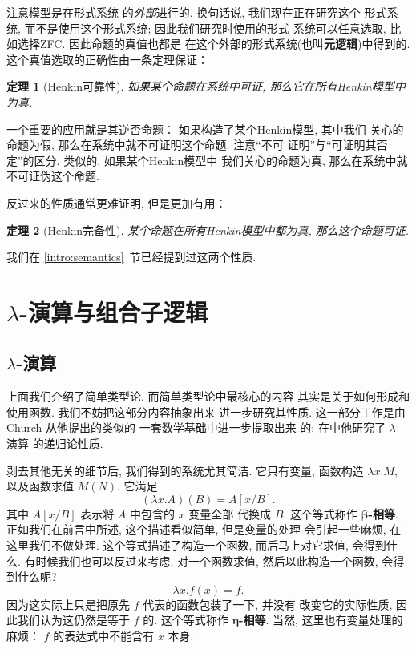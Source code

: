 \documentclass[UTF8]{ctexbook}
\theoremstyle{plain}
\newtheorem{theorem}{定理}[chapter]
\theoremstyle{definition}
\theoremstyle{remark}
\begin{document}
注意模型是在形式系统
的\emph{外部}进行的. 换句话说, 我们现在正在研究这个
形式系统, 而不是使用这个形式系统; 因此我们研究时使用的形式
系统可以任意选取, 比如选择ZFC. 因此命题的真值也都是
在这个外部的形式系统(也叫\textbf{元逻辑})中得到的.
这个真值选取的正确性由一条定理保证：
\begin{theorem}[Henkin可靠性]
如果某个命题在系统中可证, 那么它在所有Henkin模型中为真.
\end{theorem}
一个重要的应用就是其逆否命题：
如果构造了某个Henkin模型, 其中我们
关心的命题为假, 那么在系统中就不可证明这个命题. 注意“不可
证明”与“可证明其否定”的区分. 类似的, 如果某个Henkin模型中
我们关心的命题为真, 那么在系统中就不可证伪这个命题.

反过来的性质通常更难证明, 但是更加有用：
\begin{theorem}[Henkin完备性]
某个命题在所有Henkin模型中都为真, 那么这个命题可证.
\end{theorem}
我们在 \ref{intro:semantics}~节已经提到过这两个性质.

\section{\texorpdfstring{\(\lambda\)}{Lambda}-演算与组合子逻辑}
\subsection{\texorpdfstring{\(\lambda\)}{Lambda}-演算}\label{beginning:lambda}
上面我们介绍了简单类型论. 而简单类型论中最核心的内容
其实是关于如何形成和使用函数. 我们不妨把这部分内容抽象出来
进一步研究其性质. 这一部分工作是由 Church 从他提出的类似的
一套数学基础\cite{church:1932:untyped}中进一步提取出来
的; 在\cite{church:1936:lambda}中他研究了 \(\lambda\)-演算
的递归论性质.

剥去其他无关的细节后, 我们得到的系统尤其简洁. 它只有变量,
函数构造 \(\lambda x. M\), 以及函数求值 \(M(N)\).
它满足
\[(\lambda x. A)(B) = A[x/B].\]
其中 \(A[x/B]\) 表示将 \(A\) 中包含的 \(x\) 变量全部
代换成 \(B\). 这个等式称作 \textbf{\(\boldsymbol\beta\)-相等}.
正如我们在前言中所述, 这个描述看似简单, 但是变量的处理
会引起一些麻烦, 在这里我们不做处理. 这个等式描述了构造一个函数,
而后马上对它求值, 会得到什么. 有时候我们也可以反过来考虑,
对一个函数求值, 然后以此构造一个函数, 会得到什么呢?
\[\lambda x. f(x) = f.\]
因为这实际上只是把原先 \(f\) 代表的函数包装了一下, 并没有
改变它的实际性质, 因此我们认为这仍然是等于 \(f\) 的.
这个等式称作 \textbf{\(\boldsymbol\eta\)-相等}.
当然, 这里也有变量处理的麻烦： \(f\) 的表达式中不能含有 \(x\) 本身.
\end{document}
